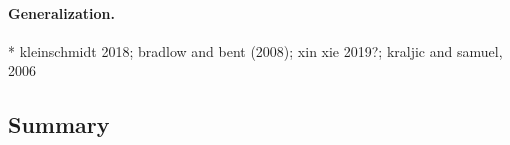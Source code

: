






\paragraph{Generalization.}

* kleinschmidt 2018;  bradlow and bent (2008); xin xie 2019?; kraljic and samuel, 2006



\subsection{Summary}

